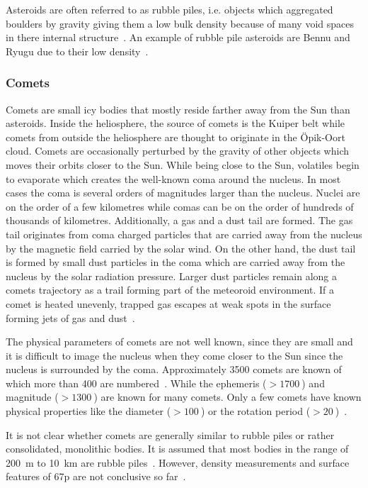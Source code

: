 Asteroids are often referred to as rubble piles, i.e. objects which aggregated boulders by gravity giving them a low bulk density because of many void spaces in there internal structure~\cite{Richardson2002GravitationalEvolution}. An example of rubble pile asteroids are Bennu and Ryugu due to their low density~\cite{Chesley2014OrbitBennu, Watanabe2019Hayabusa2Pile}.

\subsubsection{Comets}
Comets are small icy bodies that mostly reside farther away from the Sun than asteroids. Inside the heliosphere, the source of comets is the Kuiper belt while comets from outside the heliosphere are thought to originate in the \"Opik-Oort cloud. Comets are occasionally perturbed by the gravity of other objects which moves their orbits closer to the Sun. While being close to the Sun, volatiles begin to evaporate which creates the well-known coma around the nucleus. In most cases the coma is several orders of magnitudes larger than the nucleus. Nuclei are on the order of a few kilometres while comas can be on the order of hundreds of thousands of kilometres. Additionally, a gas and a dust tail are formed. The gas tail originates from coma charged particles that are carried away from the nucleus by the magnetic field carried by the solar wind. On the other hand, the dust tail is formed by small dust particles in the coma which are carried away from the nucleus by the solar radiation pressure. Larger dust particles remain along a comets trajectory as a trail forming part of the meteoroid environment. If a comet is heated unevenly, trapped gas escapes at weak spots in the surface forming jets of gas and dust~\cite{Comets, a2017comets, Soja2019IMEM2:System}.

The physical parameters of comets are not well known, since they are small and it is difficult to image the nucleus when they come closer to the Sun since the nucleus is surrounded by the coma. Approximately \SI{3500}{} comets are known of which more than \SI{400}{} are numbered~\cite{JPLEngine}. While the ephemeris ($> \SI{1700}{}$) and magnitude ($>\SI{1300}{}$) are known for many comets. Only a few comets have known physical properties like the diameter ($> \SI{100}{}$) or the rotation period ($> \SI{20}{}$)~\cite{JPLEngine}.

It is not clear whether comets are generally similar to rubble piles or rather consolidated, monolithic bodies. It is assumed that most bodies in the range of \SI{200}{\meter} to \SI{10}{\kilo\meter} are rubble piles~\cite{Walsh2018RubbleAsteroids}. However, density measurements and surface features of \gls{67p} are not conclusive so far~\cite{Weissman2020OriginNuclei}. 

